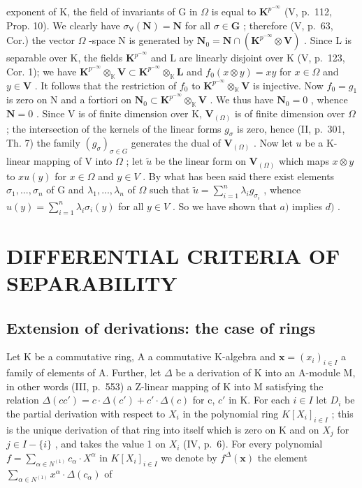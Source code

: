 exponent of K, the field of invariants of G in \(\Omega\) is equal to \(\mathbf{K}^{p^{-\infty}}\) (V, p.~112, Prop. 10). We clearly have \(\sigma_{\mathsf{V}}(\mathbf{N}) = \mathbf{N}\) for all \(\sigma \in \mathbf{G}\) ; therefore (V, p.~63, Cor.) the vector \(\Omega\) -space N is generated by \(\mathbf{N}_0 = \mathbf{N} \cap (\mathbf{K}^{p^{-\infty}} \otimes \mathbf{V})\) . Since L is separable over K, the fields \(\mathbf{K}^{p^{-\infty}}\) and L are linearly disjoint over K (V, p.~123, Cor. 1); we have \(\mathbf{K}^{p^{-\infty}} \otimes_{\mathbb{K}} \mathbf{V} \subset \mathbf{K}^{p^{-\infty}} \otimes_{\mathbb{K}} \mathbf{L}\) and \(f_0(x \otimes y) = xy\) for \(x \in \Omega\) and \(y \in \mathbf{V}\) . It follows that the restriction of \(f_0\) to \(\mathbf{K}^{p^{-\infty}} \otimes_{\mathbb{K}} \mathbf{V}\) is injective. Now \(f_0 = g_1\) is zero on N and a fortiori on \(\mathbf{N}_0 \subset \mathbf{K}^{p^{-\infty}} \otimes_{\mathbb{K}} \mathbf{V}\) . We thus have \(\mathbf{N}_0 = 0\) , whence \(\mathbf{N} = 0\) . Since V is of finite dimension over K, \(\mathbf{V}_{(\Omega)}\) is of finite dimension over \(\Omega\) ; the intersection of the kernels of the linear forms \(g_\sigma\) is zero, hence (II, p.~301, Th. 7) the family \((g_\sigma)_{\sigma \in G}\) generates the dual of \(\mathbf{V}_{(\Omega)}\) . Now let \(u\) be a K-linear mapping of V into \(\Omega\) ; let \(\tilde{u}\) be the linear form on \(\mathbf{V}_{(\Omega)}\) which maps \(x \otimes y\) to \(x u(y)\) for \(x \in \Omega\) and \(y \in V\) . By what has been said there exist elements \(\sigma_1, ..., \sigma_n\) of G and \(\lambda_1, ..., \lambda_n\) of \(\Omega\) such that \(\tilde{u} = \sum_{i=1}^{n} \lambda_i g_{\sigma_i}\) , whence \(u(y) = \sum_{i=1}^{n} \lambda_i \sigma_i(y)\) for all \(y \in V\) . So we have shown that \(a)\) implies \(d)\) .

\section{DIFFERENTIAL CRITERIA OF SEPARABILITY}

\subsection{Extension of derivations: the case of rings}

Let K be a commutative ring, A a commutative K-algebra and \(\mathbf{x} = (x_i)_{i \in I}\) a family of elements of A. Further, let \(\Delta\) be a derivation of K into an A-module M, in other words (III, p.~553) a Z-linear mapping of K into M satisfying the relation \(\Delta(cc') = c \cdot \Delta(c') + c' \cdot \Delta(c)\) for c, \(c'\) in K. For each \(i \in I\) let \(D_i\) be the partial derivation with respect to \(X_i\) in the polynomial ring \(K[X_i]_{i \in I}\) ; this is the unique derivation of that ring into itself which is zero on K and on \(X_j\) for \(j \in I - \{i\}\) , and takes the value 1 on \(X_i\) (IV, p.~6). For every polynomial \(f = \sum_{\alpha \in N^{(1)}} c_\alpha \cdot X^\alpha\) in \(K[X_i]_{i \in I}\) we denote by \(f^\Delta(\mathbf{x})\) the element \(\sum_{\alpha \in N^{(1)}} x^\alpha \cdot \Delta(c_\alpha)\) of

